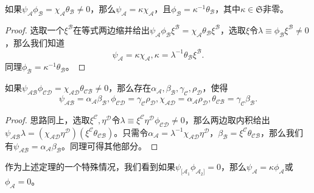 \begin{them}[label={them:3.5}]{}
	如果$\psi _{\mathcal{A}} \phi _{\mathcal{B}} =\chi _{\mathcal{A}} \theta _{\mathcal{B}} \neq 0$，那么$\psi _{\mathcal{A}} =\kappa \chi _{\mathcal{A}}$，且$\phi _{\mathcal{B}} =\kappa ^{-1} \theta _{\mathcal{B}}$，其中$\kappa \in \mathfrak{S}$非零。
\end{them}

\begin{proof}
	选取一个$\xi ^{\mathcal{B}}$在等式两边缩并给出$\psi _{\mathcal{A}} \phi _{\mathcal{B}} \xi ^{\mathcal{B}} =\chi _{\mathcal{A}} \theta _{\mathcal{B}} \xi ^{\mathcal{B}}$，选取$\xi $令$\lambda \equiv \phi _{\mathcal{B}} \xi ^{\mathcal{B}} \neq 0$，那么我们知道
	\begin{equation*}
		\psi _{\mathcal{A}} =\kappa \chi _{\mathcal{A}} ,\kappa =\lambda ^{-1} \theta _{\mathcal{B}} \xi ^{\mathcal{B}} .
	\end{equation*}
	同理$\phi _{\mathcal{B}} =\kappa ^{-1} \theta _{\mathcal{B}}$。
\end{proof}

\begin{them}[label={them:3.6}]{}
	如果$\psi _{\mathcal{AB}} \phi _{\mathcal{CD}} =\chi _{\mathcal{AD}} \theta _{\mathcal{CB}} \neq 0$，那么存在$\alpha _{\mathcal{A}} ,\beta _{\mathcal{B}} ,\gamma _{\mathcal{C}} ,\rho _{\mathcal{D}}$，使得
	\begin{equation*}
		\psi _{\mathcal{AB}} =\alpha _{\mathcal{A}} \beta _{\mathcal{B}} ,\phi _{\mathcal{CD}} =\gamma _{\mathcal{C}} \rho _{\mathcal{D}} ,\chi _{\mathcal{AD}} =\alpha _{\mathcal{A}} \rho _{\mathcal{D}} ,\theta _{\mathcal{CB}} =\gamma _{\mathcal{C}} \beta _{\mathcal{B}} .
	\end{equation*}
\end{them}

\begin{proof}
	思路同上，选取$\xi ^{\mathcal{C}} ,\eta ^{\mathcal{D}}$令$\lambda \equiv \xi ^{\mathcal{C}} \eta ^{\mathcal{D}} \phi _{\mathcal{CD}} \neq 0$，那么两边取内积给出$\psi _{\mathcal{AB}} \lambda =(\chi _{\mathcal{AD}} \eta ^{\mathcal{D}} )(\xi ^{\mathcal{C}} \theta _{\mathcal{CB}} )$。只需令$\alpha _{\mathcal{A}} =\lambda ^{-1} \chi _{\mathcal{AD}} \eta ^{\mathcal{D}}$，$\beta _{\mathcal{B}} =\xi ^{\mathcal{C}} \theta _{\mathcal{CB}}$，那么我们有$\psi _{\mathcal{AB}} =\alpha _{\mathcal{A}} \beta _{\mathcal{B}}$。同理可得其他部分。
\end{proof}

作为上述定理的一个特殊情况，我们看到如果$\psi _{[\mathcal{A}_{1}} \phi _{\mathcal{A}_{2}]} =0$，那么$\psi _{\mathcal{A}} =\kappa \phi _{\mathcal{A}}$或$\phi _{\mathcal{A}} =0$。

